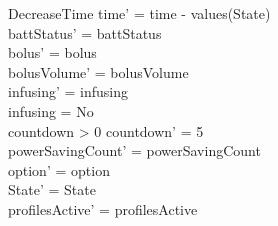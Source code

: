 \begin{schema}{DecreaseTime}
	time' = time - values(State)\\
	battStatus' = battStatus\\
	bolus' = bolus\\
	\pagebreak
	bolusVolume' = bolusVolume\\
	infusing' = infusing\\
	infusing = No\\
	countdown > 0 \land countdown' = 5\\
	powerSavingCount' = powerSavingCount\\ 
	option' = option\\
State' = State\\
profilesActive' = profilesActive
\end{schema}

